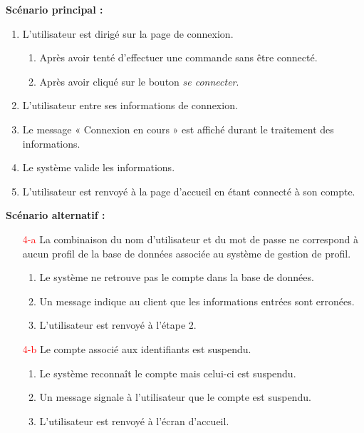 \documentclass[16pt]{report}
\begin{document}
\textbf{Scénario principal :}
\begin{enumerate}[leftmargin=4em]
    \item L'utilisateur est dirigé sur la page de connexion.
    \begin{enumerate}[leftmargin=4em]
        \item Après avoir tenté d'effectuer une commande sans être connecté.
        \item Après avoir cliqué sur le bouton \textit{se connecter}.
    \end{enumerate}
    \item L'utilisateur entre ses informations de connexion.
    \item Le message « Connexion en cours » est affiché durant le traitement des informations.
    \item Le système valide les informations.
    \item L'utilisateur est renvoyé à la page d'accueil en étant connecté à son compte.
\end{enumerate}

\textbf{Scénario alternatif :}
\begin{enumerate}[leftmargin=4em]
    \item[\textcolor{red}{4-a}] La combinaison du nom d'utilisateur et du mot de passe ne correspond à aucun profil de la base de données associée au système de gestion de profil.
    \begin{enumerate}[leftmargin=4em]
        \item Le système ne retrouve pas le compte dans la base de données.
        \item Un message indique au client que les informations entrées sont erronées.
        \item L'utilisateur est renvoyé à l'étape 2.
    \end{enumerate}
    \item[\textcolor{red}{4-b}] Le compte associé aux identifiants est suspendu.
    \begin{enumerate}[leftmargin=4em]
        \item Le système reconnaît le compte mais celui-ci est suspendu.
        \item Un message signale à l'utilisateur que le compte est suspendu.
        \item L'utilisateur est renvoyé à l'écran d'accueil.
    \end{enumerate}
\end{enumerate}
\end{document}
